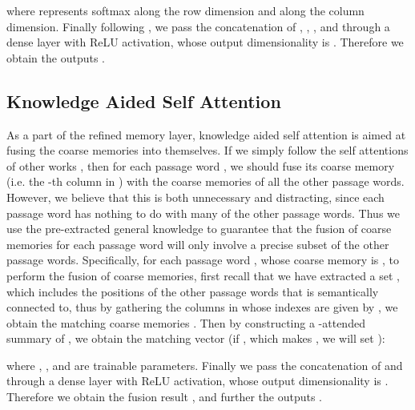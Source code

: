\documentclass[11pt,a4paper]{article}
\begin{document}
where  represents softmax along the row dimension and  along the column dimension. Finally following \citet{clarkchristopher:2017}, we pass the concatenation of , , , and  through a dense layer with ReLU activation, whose output dimensionality is . Therefore we obtain the outputs .

\subsection{Knowledge Aided Self Attention}
As a part of the refined memory layer, knowledge aided self attention is aimed at fusing the coarse memories  into themselves. If we simply follow the self attentions of other works \cite{wangwenhui:2017,huanghsinyuan:2017,liuxiaodong:2017,clarkchristopher:2017}, then for each passage word , we should fuse its coarse memory  (i.e. the -th column in ) with the coarse memories of all the other passage words. However, we believe that this is both unnecessary and distracting, since each passage word has nothing to do with many of the other passage words. Thus we use the pre-extracted general knowledge to guarantee that the fusion of coarse memories for each passage word will only involve a precise subset of the other passage words. Specifically, for each passage word , whose coarse memory is , to perform the fusion of coarse memories, first recall that we have extracted a set , which includes the positions of the other passage words that  is semantically connected to, thus by gathering the columns in  whose indexes are given by , we obtain the matching coarse memories . Then by constructing a -attended summary of , we obtain the matching vector  (if , which makes , we will set ):


where , , and  are trainable parameters. Finally we pass the concatenation of  and  through a dense layer with ReLU activation, whose output dimensionality is . Therefore we obtain the fusion result , and further the outputs .
\end{document}
